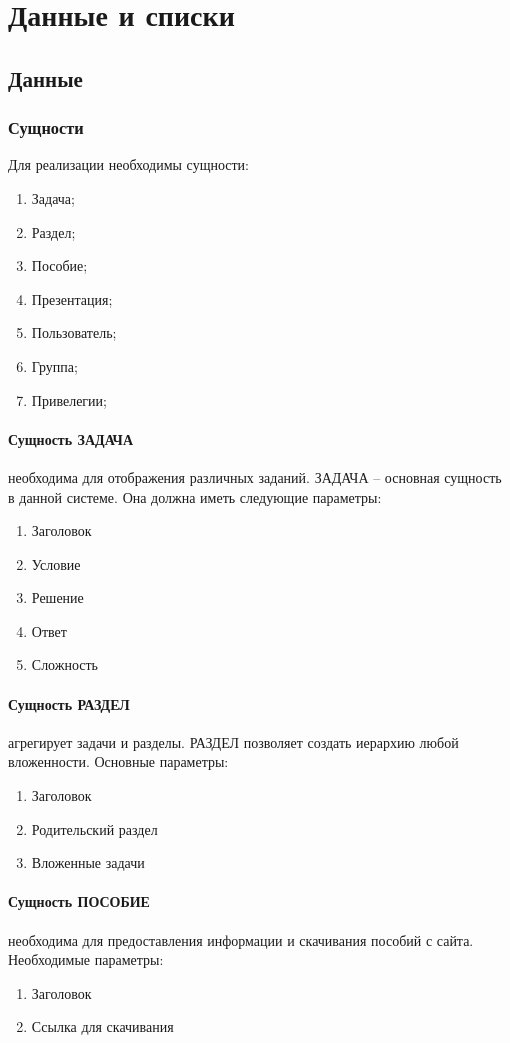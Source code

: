 \section{Данные и списки}
\subsection{Данные}
\subsubsection{Сущности}

Для реализации необходимы сущности:
\begin{enumerate}
  \item Задача;
  \item Раздел;
  \item Пособие;
  \item Презентация;
  \item Пользователь;
  \item Группа;
  \item Привелегии;
\end{enumerate}

\paragraph{Сущность ЗАДАЧА} необходима для отображения различных заданий. ЗАДАЧА -- основная сущность в данной системе. Она должна иметь следующие параметры:
\begin{enumerate}
  \item Заголовок
  \item Условие
  \item Решение
  \item Ответ
  \item Сложность
\end{enumerate}

\paragraph{Сущность РАЗДЕЛ} агрегирует задачи и разделы. РАЗДЕЛ позволяет создать иерархию любой вложенности. Основные параметры:
\begin{enumerate}
  \item Заголовок
  \item Родительский раздел
  \item Вложенные задачи
\end{enumerate}

\paragraph{Сущность ПОСОБИЕ} необходима для предоставления информации и скачивания пособий с сайта. Необходимые параметры:
\begin{enumerate}
  \item Заголовок
  \item Ссылка для скачивания
\end{enumerate}

